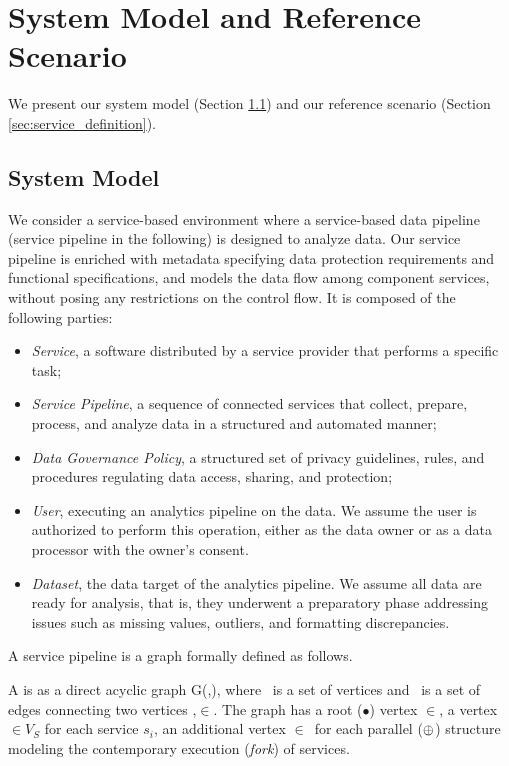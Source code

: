 \section{System Model and Reference Scenario}\label{sec:requirements}
We present our system model (Section \ref{sec:systemmodel}) and our reference scenario (Section \ref{sec:service_definition}).

\subsection{System Model}\label{sec:systemmodel}
{\color{OurColor} We consider a service-based environment where a service-based data pipeline (service pipeline in the following) is designed to analyze data. Our service pipeline is enriched with metadata specifying data protection requirements and functional specifications, and models the data flow among component services, without posing any restrictions on the control flow.} It is composed of the following parties:
\begin{itemize}
  \item \emph{Service}, a software distributed by a service provider that performs a specific task;
  \item \emph{Service Pipeline}, a sequence of connected services that collect, prepare, process, and analyze data in a structured and automated manner;
  \item \emph{Data Governance Policy}, a structured set of privacy guidelines, rules, and procedures regulating data access, sharing, and protection;
  \item \emph{User}, executing an analytics pipeline on the data. We assume the user is authorized to perform this operation, either as the data owner or as a data processor with the owner's consent.
  \item \emph{Dataset}, the data target of the analytics pipeline. We assume all data are ready for analysis, that is, they underwent a preparatory phase addressing issues such as missing values, outliers, and formatting discrepancies.
\end{itemize}

\vspace{0.5em}

A service pipeline is a graph formally defined as follows.

\vspace{0.5em}

\begin{definition}\label{def:pipeline}
  A \pipeline is as a direct acyclic graph G(\V,\E), where \V\ is a set of vertices and \E\ is a set of edges connecting two vertices ,$\in$\V.
  The graph has a root ($\bullet$) vertex $\in$\V, a vertex $\in$$V_S$ for each service $s_i$, an additional vertex $\in$\V\ for each parallel ($\oplus$) structure modeling the contemporary execution (\emph{fork}) of services.
\end{definition}


